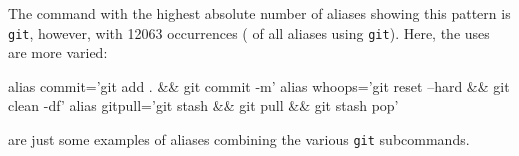 The command with the highest absolute number of aliases showing this pattern is \verb|git|, however, with \num{12063} occurrences ( of all aliases using \verb|git|).
Here, the uses are more varied:
\begin{CVerbatim}
alias commit='git add . && git commit -m'
alias whoops='git reset --hard && git clean -df'
alias gitpull='git stash && git pull && git stash pop'
\end{CVerbatim}
are just some examples of aliases combining the various \verb|git| subcommands.
